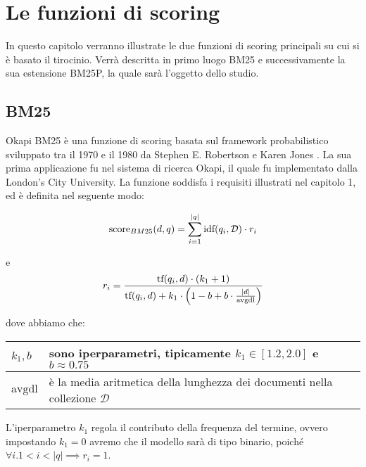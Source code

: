 \chapter{Le funzioni di scoring}
In questo capitolo verranno illustrate le due funzioni di scoring principali su cui si è basato il tirocinio.
Verrà descritta in primo luogo BM25 e successivamente la sua estensione BM25P, la quale sarà l'oggetto
dello studio.

\section{BM25}
Okapi BM25 è una funzione di scoring basata sul framework probabilistico sviluppato tra il 1970 e il 1980
da Stephen E. Robertson e Karen Jones \cite{10.1561/1500000019}. La sua prima applicazione fu nel sistema di ricerca Okapi, il quale
fu implementato dalla London's City University. La funzione soddisfa i requisiti illustrati nel capitolo 1, ed è definita
nel seguente modo:

\begin{definizione}\label{def:bm25}
	$$
	\text{score}_{BM25}(d, q) = \sum_{i=1}^{|q|} \text{idf}(q_i, \mathcal{D}) \cdot r_i
	$$
	
	e
	$$
	r_i = \frac{
		\text{tf}(q_i, d) \cdot (k_1 +1)
	}{
		\text{tf}(q_i, d) + k_1 \cdot \left(1-b + b \cdot \frac{\left|d\right|}{\text{avgdl}}\right)
	}
	$$
	
	
	dove abbiamo che:
	
	\begin{table}[h]
	\begin{tabular}{|l|p{110mm}|}
		\hline
		$k_1, b$ &  sono iperparametri, \newline tipicamente $k_1 \in\left[1.2, 2.0\right]$ e $b \approx 0.75$  \\
		\hline
		$\text{avgdl}$ &  è la media aritmetica della lunghezza dei documenti nella collezione $\mathcal{D}$  \\
		\hline
	\end{tabular}
\end{table}
\end{definizione}


L'iperparametro $k_1$ regola il contributo della frequenza del termine, ovvero impostando $k_1 = 0$ avremo
che il modello sarà di tipo binario, poiché $\forall i . 1 < i < \left|q\right| \implies r_i = 1$.

